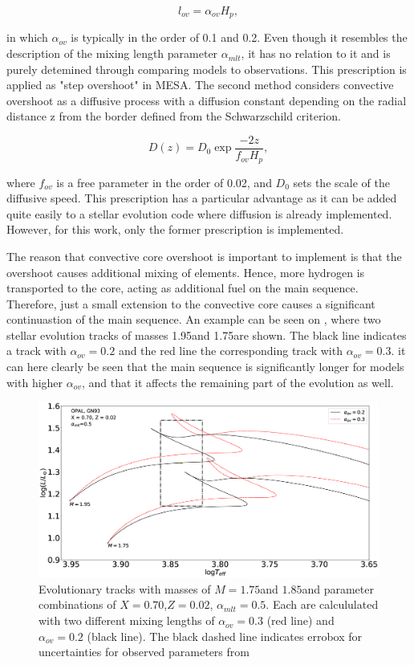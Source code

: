 \begin{equation}
    l_{ov} = \alpha_{ov}H_p,  
\end{equation}

\noindent in which $\alpha_{ov}$ is typically in the order of 0.1 and 0.2. Even though it resembles the description of the mixing length parameter $\alpha_{mlt}$, it has no relation to it and is purely detemined through comparing models to observations. This prescription is applied as "step overshoot" in MESA. The second method considers convective overshoot as a diffusive process with a diffusion constant depending on the radial distance z from the border defined from the Schwarzschild criterion. 

\begin{equation}
    D(z) = D_0 \exp{\frac{-2z}{f_{ov}H_p}},
\end{equation}

\noindent where $f_{ov}$ is a free parameter in the order of 0.02, and $D_0$ sets the scale of the diffusive speed. This prescription has a particular advantage as it can be added quite easily to a stellar evolution code where diffusion is already implemented. However, for this work, only the former prescription is implemented.

The reason that convective core overshoot is important to implement is that the overshoot causes additional mixing of elements. Hence, more hydrogen is transported to the core, acting as additional fuel on the main sequence. Therefore, just a small extension to the convective core causes a significant continuastion of the main sequence. An example can be seen on , where two stellar evolution tracks of masses 1.95\msun and 1.75\msun are shown. The black line indicates a track with $\alpha_{ov}=0.2$ and the red line the corresponding track with $\alpha_{ov}=0.3$. it can here clearly be seen that the main sequence is significantly longer for models with higher $\alpha_{ov}$, and that it affects the remaining part of the evolution as well. 

\begin{figure}[htbp]
    \centering
    \includegraphics[width=1\textwidth]{overshoots_example.eps}
    \caption{Evolutionary tracks with masses of $M=1.75$\msun and $1.85$\msun and parameter combinations of $X=0.70$,$Z=0.02$, $\alpha_{mlt}=0.5$. Each are calcululated with two different mixing lengths of $\alpha_{ov}=0.3$ (red line) and $\alpha_{ov}=0.2$ (black line). The black dashed line indicates errobox for uncertainties for observed parameters from \citet{lenz2010delta}}
    \label{ov_example}
\end{figure}
